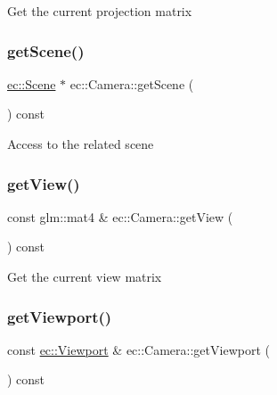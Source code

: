 Get the current projection matrix \mbox{\label{classec_1_1_camera_a33ad8a16eff39b34db86c6dbf2bbabe4}} 
\subsubsection{\texorpdfstring{get\+Scene()}{getScene()}}
{\footnotesize\ttfamily \mbox{\hyperlink{classec_1_1_scene}{ec\+::\+Scene}} $\ast$ ec\+::\+Camera\+::get\+Scene (\begin{DoxyParamCaption}{ }\end{DoxyParamCaption}) const}

Access to the related scene \mbox{\label{classec_1_1_camera_aa273a9bbe51bc00e8b0a35d8c79b0766}} 
\subsubsection{\texorpdfstring{get\+View()}{getView()}}
{\footnotesize\ttfamily const glm\+::mat4 \& ec\+::\+Camera\+::get\+View (\begin{DoxyParamCaption}{ }\end{DoxyParamCaption}) const}

Get the current view matrix \mbox{\label{classec_1_1_camera_adb2920a7a634aadcaca579eaf3fc1ad0}} 
\subsubsection{\texorpdfstring{get\+Viewport()}{getViewport()}}
{\footnotesize\ttfamily const \mbox{\hyperlink{classec_1_1_viewport}{ec\+::\+Viewport}} \& ec\+::\+Camera\+::get\+Viewport (\begin{DoxyParamCaption}{ }\end{DoxyParamCaption}) const}

\mbox{\label{classec_1_1_camera_abdc800333490ec4f890559951340bd08}} 
